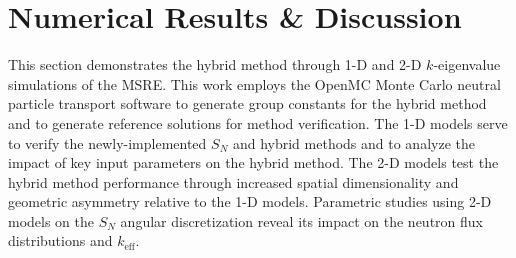 \section{Numerical Results \& Discussion} \label{sec:msre}

This section demonstrates the hybrid method through 1-D and 2-D $k$-eigenvalue
simulations of the \gls{MSRE}. This work employs the OpenMC Monte Carlo neutral
particle transport software \cite{romano_openmc:_2015} to generate group constants for the hybrid
method and to generate reference solutions for method verification.
The 1-D models serve to verify the newly-implemented $S_N$ and hybrid methods
and to analyze the impact of key input parameters on the hybrid method. The
2-D models test the hybrid method performance through increased spatial dimensionality and
geometric asymmetry relative to the 1-D models. Parametric studies using 2-D models on the $S_N$ angular
discretization reveal its impact on the neutron flux distributions and $k_\text{eff}$.



%
%

